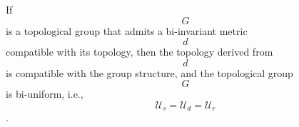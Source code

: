 If $$G$$ is a topological group that admits a bi-invariant metric $$d$$ compatible with its topology, then the topology derived from $$d$$ is compatible with the group structure, and the topological group $$G$$ is bi-uniform, i.e., $$\mathcal{U}_s = \mathcal{U}_d = \mathcal{U}_r$$.
